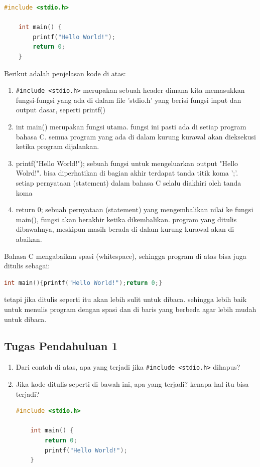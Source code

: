 \begin{lstlisting}[language=c,caption=Contoh program sederhana dalam bahasa C,label=lst:helloworld,captionpos=t]
	#include <stdio.h>

	int main() {
		printf("Hello World!");
		return 0;
	}
	\end{lstlisting}
Berikut adalah penjelasan kode di atas:
\begin{enumerate}
	\item \verb|#include <stdio.h>|
	merupakan sebuah header dimana kita memasukkan fungsi-fungsi yang ada di dalam file 'stdio.h' yang berisi fungsi input dan output dasar, seperti printf()
	\item int main()
    merupakan fungsi utama. fungsi ini pasti ada di setiap program bahasa C. 
    semua program yang ada di dalam kurung kurawal {} akan dieksekusi ketika program dijalankan.
	\item printf("Hello World!");
    sebuah fungsi untuk mengeluarkan output "Hello Wolrd!".
    bisa diperhatikan di bagian akhir terdapat tanda titik koma ';'. setiap pernyataan (statement) dalam bahasa C selalu diakhiri oleh tanda koma
	\item return 0;
    sebuah pernyataan (statement) yang mengembalikan nilai ke fungsi main(), fungsi akan berakhir ketika dikembalikan.
    program yang ditulis dibawahnya, meskipun masih berada di dalam kurung kurawal akan di abaikan.
\end{enumerate}
Bahasa C mengabaikan spasi (whitespace), sehingga program di atas bisa juga ditulis sebagai:
\begin{lstlisting}[language=c]
	int main(){printf("Hello World!");return 0;}
\end{lstlisting}
tetapi jika ditulis seperti itu akan lebih sulit untuk dibaca.
sehingga lebih baik untuk menulis program dengan spasi dan di baris yang berbeda agar lebih mudah untuk dibaca.

\subsection*{Tugas Pendahuluan 1}
\begin{enumerate}
	\item Dari contoh di atas, apa yang terjadi jika \verb|#include <stdio.h>| dihapus?
  	\item Jika kode ditulis seperti di bawah ini, apa yang terjadi? kenapa hal itu bisa terjadi?
	\begin{lstlisting}[language=c]
	#include <stdio.h>

	int main() {
		return 0;
		printf("Hello World!");
	}
	\end{lstlisting}
\end{enumerate}

